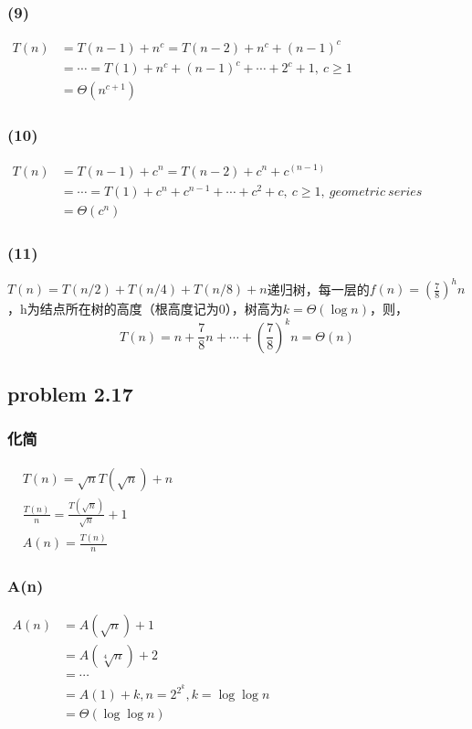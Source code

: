 \documentclass[11pt]{ctexart}
\begin{document}
	\subsubsection*{(9)}
	$\begin{aligned}
	T(n)
	&=T(n-1)+n^c
	=T(n-2)+n^c+(n-1)^c\\
	&=\cdots
	=T(1)+n^c+(n-1)^c+\cdots+2^c+1,\ c\geq1\\
	&=\Theta (n^{c+1})
	\end{aligned}
	$
	\subsubsection*{(10)}
	$\begin{aligned}
	T(n)
	&=T(n-1)+c^n
	=T(n-2)+c^n+c^(n-1)\\
	&=\cdots
	=T(1)+c^n+c^{n-1}+\cdots+c^2+c,\ c\geq1,\ geometric\ series\\
	&=\Theta (c^n)
	\end{aligned}
	$
	\subsubsection*{(11)}
	$T(n)=T(n/2)+T(n/4)+T(n/8)+n$递归树，每一层的$f(n)=(\frac{7}{8})^h n$，h为结点所在树的高度（根高度记为0），树高为$k=\Theta (\log n)$，则，
	$$T(n)=n+\frac{7}{8}n+\cdots+(\frac{7}{8})^k n=\Theta (n)$$
	\subsection*{problem 2.17}
	\subsubsection*{化简}
	$\begin{aligned}
	&T(n)=\sqrt{n}T(\sqrt{n})+n\\
	&\frac{T(n)}{n}=\frac{T(\sqrt{n})}{\sqrt{n}}+1\\
	&A(n)=\frac{T(n)}{n}
	\end{aligned}
	$
	\subsubsection*{A(n)}
	$\begin{aligned}
	A(n)&=A(\sqrt{n})+1\\
	&=A(\sqrt[4]{n})+2\\
	&=\cdots\\
	&=A(1)+k,n=2^{2^k},k=\log\log n\\
	&=\Theta(\log\log n)\\
	\end{aligned}
	$\\
\end{document}

